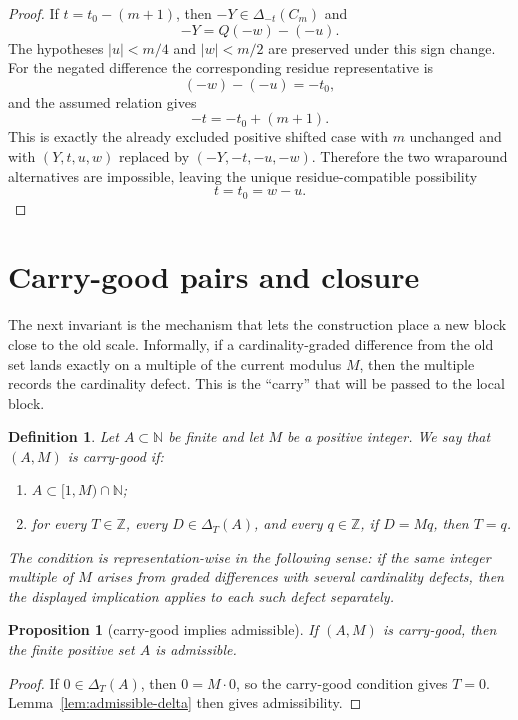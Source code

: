 \documentclass[11pt]{article}
\newtheorem{proposition}{Proposition}
\newtheorem{definition}{Definition}
\newcommand{\N}{\mathbb{N}}
\newcommand{\Z}{\mathbb{Z}}
\newcommand{\D}{\Delta}
\begin{document}
\begin{proof}
If $t=t_0-(m+1)$, then $-Y\in\D_{-t}(C_m)$ and
\[
        -Y=Q(-w)-(-u).
\]
The hypotheses $|u|<m/4$ and $|w|<m/2$ are preserved under this sign change.  For the negated difference the corresponding residue representative is
\[
        (-w)-(-u)=-t_0,
\]
and the assumed relation gives
\[
        -t=-t_0+(m+1).
\]
This is exactly the already excluded positive shifted case with $m$ unchanged and with $(Y,t,u,w)$ replaced by $(-Y,-t,-u,-w)$.  Therefore the two wraparound alternatives are impossible, leaving the unique residue-compatible possibility
\[
        t=t_0=w-u.
\]
\end{proof}

\section{Carry-good pairs and closure}

The next invariant is the mechanism that lets the construction place a new block close to the old scale.  Informally, if a cardinality-graded difference from the old set lands exactly on a multiple of the current modulus $M$, then the multiple records the cardinality defect.  This is the ``carry'' that will be passed to the local block.

\begin{definition}
Let $A\subset\N$ be finite and let $M$ be a positive integer.  We say that $(A,M)$ is \emph{carry-good} if:
\begin{enumerate}
    \item $A\subset [1,M)\cap\N$;
    \item for every $T\in\Z$, every $D\in \D_T(A)$, and every $q\in\Z$, if $D=Mq$, then $T=q$.
\end{enumerate}
The condition is representation-wise in the following sense: if the same integer multiple of $M$ arises from graded differences with several cardinality defects, then the displayed implication applies to each such defect separately.
\end{definition}

\begin{proposition}[carry-good implies admissible]\label{prop:carry-good-admissible}
If $(A,M)$ is carry-good, then the finite positive set $A$ is admissible.
\end{proposition}

\begin{proof}
If $0\in \D_T(A)$, then $0=M\cdot0$, so the carry-good condition gives $T=0$.  Lemma~\ref{lem:admissible-delta} then gives admissibility.
\end{proof}
\end{document}
